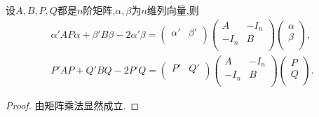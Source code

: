 \documentclass[../../main.tex]{subfiles}%
\begin{document}
\begin{lemma}\label{lemma:矩阵二次型技巧}
设$A,B,P,Q$都是$n$阶矩阵,$\alpha,\beta$为$n$维列向量,则
\begin{align*}
\alpha ' AP\alpha +\beta ' B\beta -2\alpha ' \beta =\left( \begin{matrix}
\alpha '&		\beta '\\
\end{matrix} \right) \left( \begin{matrix}
A&		-I_n\\
-I_n&		B\\
\end{matrix} \right) \left( \begin{array}{c}
\alpha\\
\beta\\
\end{array} \right) ,
\\
P' AP+Q' BQ-2P' Q=\left( \begin{matrix}
P'&		Q'\\
\end{matrix} \right) \left( \begin{matrix}
A&		-I_n\\
-I_n&		B\\
\end{matrix} \right) \left( \begin{array}{c}
P\\
Q\\
\end{array} \right) .
\end{align*}
\end{lemma}
\begin{proof}

由矩阵乘法显然成立.

\end{proof}
\end{document}
